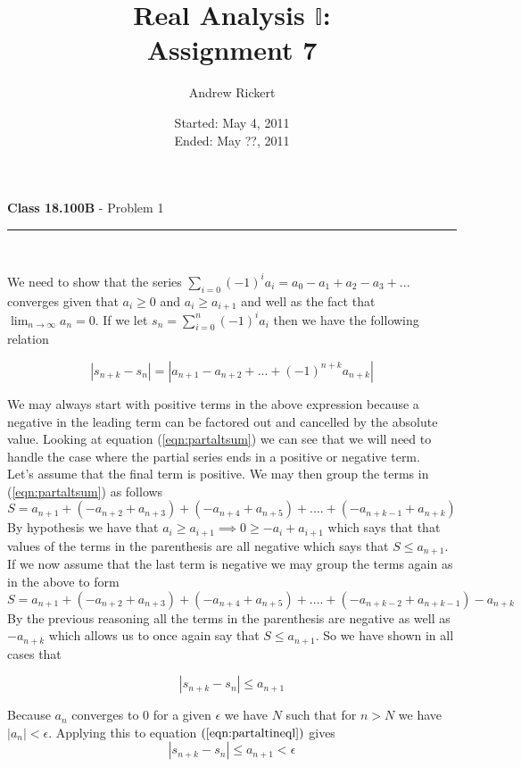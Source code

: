 \documentclass[11pt,reqno]{article}
\title{Real Analysis $\mathbb{I}$: \\ Assignment 7}
\author{Andrew Rickert}
\date{Started: May 4, 2011 \\ \hspace{1pt} Ended: May ??,  2011}                                           %
\begin{document}
\maketitle


\begin{flushleft} 
\textbf{Class 18.100B} - Problem 1\\
\rule{500pt}{1pt}\\
\end{flushleft} 

We need to show that the series $\sum_{i = 0} (-1)^i a_i = a_0 - a_1 + a_2 - a_3 + ... $ converges given that  $a_i \ge 0$ and $ a_i \ge a_{i+1}$ and well as the fact that $\lim_{n \to \infty} a_n = 0$. If we let $s_n = \sum_{i = 0}^n (-1)^i a_i$ then we have the following relation 

\begin{equation} 
|s_{n+k} - s_n| = |a_{n+1} - a_{n+2} + ... + (-1)^{n+k} a_{n+k}| \label{eqn:partaltsum}
\end{equation}

We may always start with positive terms in the above expression because a negative in the leading term can be factored out and cancelled by the absolute value. Looking at equation (\ref{eqn:partaltsum}) we can see that we will need to handle the case where the partial series ends in a positive or negative term. \\
\indent Let's assume that the final term is positive. We may then group the terms in (\ref{eqn:partaltsum}) as follows
\[ S = a_{n+1} + (-a_{n+2} + a_{n+3}) + (-a_{n+4} + a_{n+5}) + .... + (-a_{n+k-1} + a_{n+k}) \]
By hypothesis we have that $a_i \ge a_{i+1} \implies 0 \ge -a_i + a_{i+1} $ which says that that values of the terms in the parenthesis are all negative which says that $S \le a_{n+1}$.\\
If we now assume that the last term is negative we may group the terms again as in the above to form
\[ S = a_{n+1} + (-a_{n+2} + a_{n+3}) + (-a_{n+4} + a_{n+5}) + .... + (-a_{n+k-2} + a_{n+k-1}) - a_{n+k} \]
By the previous reasoning all the terms in the parenthesis are negative as well as $-a_{n+k}$ which allows us to once again say that $S \le a_{n+1}$. So we have shown in all cases that 

\begin{equation}
|s_{n+k} - s_n| \le a_{n+1} \label{eqn:partaltineql}
\end{equation}

Because $a_n$ converges to 0 for a given $\epsilon$ we have $N$ such that for $n > N$ we have $|a_n| < \epsilon$. Applying this to equation $(\ref{eqn:partaltineql})$ gives 
\[ |s_{n+k} - s_n| \le a_{n+1} < \epsilon \]
\end{document}
